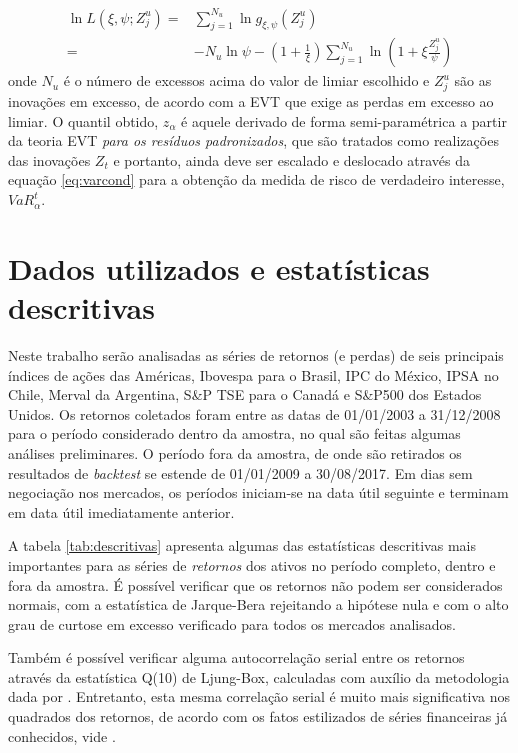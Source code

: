 \documentclass[1p]{elsarticle}
\theoremstyle{definition}
\begin{document}
\begin{align}
\label{eq:gpdloglik}
\ln L(\xi, \psi; Z^u_j)=&\sum\limits_{j=1}^{N_u}\ln g_{\xi, \psi}(Z^u_j)\nonumber\\
					   =&-N_u \ln \psi-\left(1+\frac{1}{\xi}\right)\sum\limits_{j=1}^{N_u}\ln \left(1+\xi\frac{Z^u_j}{\psi}\right) 
\end{align}
onde $N_u$ é o número de excessos acima do valor de limiar escolhido e $Z^u_j$ são as inovações em excesso, de acordo com a EVT que exige as perdas em excesso ao limiar. O quantil obtido, $z_\alpha$ é aquele derivado de forma semi-paramétrica a partir da teoria EVT \emph{para os resíduos padronizados}, que são tratados como realizações das inovações $Z_t$ e portanto, ainda deve ser escalado e deslocado através da equação \eqref{eq:varcond} para a obtenção da medida de risco de verdadeiro interesse, $VaR_\alpha^t$.

\section{Dados utilizados e estatísticas descritivas}
\label{sec:descritivas}

Neste trabalho serão analisadas as séries de retornos (e perdas) de seis principais índices de ações das Américas, Ibovespa para o Brasil, IPC do México, IPSA no Chile, Merval da Argentina, S\&P TSE para o Canadá e S\&P500 dos Estados Unidos. Os retornos coletados foram entre as datas de 01/01/2003 a 31/12/2008 para o período considerado dentro da amostra, no qual são feitas algumas análises preliminares. O período fora da amostra, de onde são retirados os resultados de \emph{backtest} se estende de 01/01/2009 a 30/08/2017. Em dias sem negociação nos mercados, os períodos iniciam-se na data útil seguinte e terminam em data útil imediatamente anterior.

A tabela \ref{tab:descritivas} apresenta algumas das estatísticas descritivas mais importantes para as séries de \emph{retornos} dos ativos no período completo, dentro e fora da amostra. É possível verificar que os retornos não podem ser considerados normais, com a estatística de Jarque-Bera rejeitando a hipótese nula e com o alto grau de curtose em excesso verificado para todos os mercados analisados.

Também é possível verificar alguma autocorrelação serial entre os retornos através da estatística Q(10) de Ljung-Box, calculadas com auxílio da metodologia dada por \cite{Fisher2012}. Entretanto, esta mesma correlação serial é muito mais significativa nos quadrados dos retornos, de acordo com os fatos estilizados de séries financeiras já conhecidos, vide \cite{Cont2001}.
\end{document}
